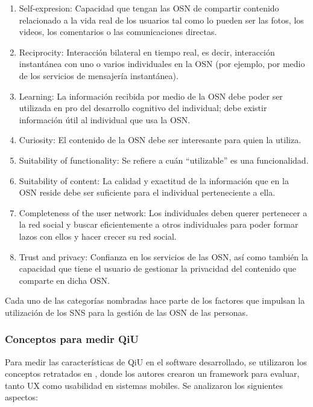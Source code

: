 \begin{enumerate}
  \item Self-expresion: Capacidad que tengan las OSN de compartir contenido relacionado a la vida real de los usuarios tal como lo pueden ser las fotos, los videos, los comentarios o las comunicaciones directas.
  \item Reciprocity: Interacción bilateral en tiempo real, es decir, interacción instantánea con uno o varios individuales en la OSN (por ejemplo, por medio de los servicios de mensajería instantánea).
  \item Learning: La información recibida por medio de la OSN debe poder ser utilizada en pro del desarrollo cognitivo del individual; debe existir información útil al individual que usa la OSN.
  \item Curiosity: El contenido de la OSN debe ser interesante para quien la utiliza.
  \item Suitability of functionality: Se refiere a cuán ``utilizable'' es una funcionalidad.
  \item Suitability of content: La calidad y exactitud de la información que en la OSN reside debe ser suficiente para el individual perteneciente a ella.
  \item Completeness of the user network: Los individuales deben querer pertenecer a la red social y buscar eficientemente a otros individuales para poder formar lazos con ellos y hacer crecer su red social.
  \item Trust and privacy: Confianza en los servicios de las OSN, así como también la capacidad que tiene el usuario de gestionar la privacidad del contenido que comparte en dicha OSN. \cite{social_experience}
\end{enumerate}

Cada uno de las categorías nombradas hace parte de los factores que impulsan la utilización de los SNS para la gestión de las OSN de las personas.

\subsubsection{Conceptos para medir QiU}

Para medir las características de QiU en el software desarrollado, se utilizaron los conceptos retratados en \cite{usability_ux}, donde los autores crearon un framework para evaluar, tanto UX como usabilidad en sistemas mobiles. Se analizaron los siguientes aspectos:

